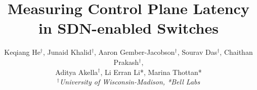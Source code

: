 \documentclass[letterpaper]{sig-alternate-10pt}
\begin{document}

\title{Measuring Control Plane Latency in SDN-enabled Switches}

\author{
{
    Keqiang He$^\dag$,
    Junaid Khalid$^\dag$,
    Aaron Gember-Jacobson$^\dag$,
    Sourav Das$^\dag$,
    Chaithan Prakash$^\dag$,
}\\
{
    Aditya Akella$^\dag$,
    Li Erran Li*,
    Marina Thottan*
}\\
{\em $^\dag$University of Wisconsin-Madison, *Bell Labs}
}
\maketitle





%
%
%
%
%



{
\small


}

\newpage
%
%
\end{document}
